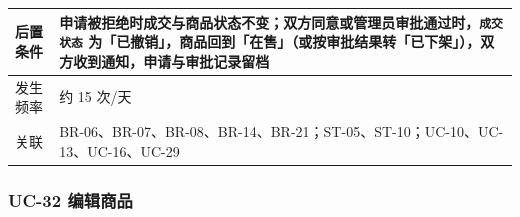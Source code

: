 \documentclass[12pt,a4paper]{ctexart}
\begin{document}
{\begin{longtable}{|p{2.75cm}|p{13.25cm}|}
\hline
后置条件 & 申请被拒绝时成交与商品状态不变；双方同意或管理员审批通过时，\texttt{成交状态} 为「已撤销」，商品回到「在售」（或按审批结果转「已下架」），双方收到通知，申请与审批记录留档 \\
\hline
发生频率 & 约 15 次/天 \\
\hline
关联 & BR-06、BR-07、BR-08、BR-14、BR-21；ST-05、ST-10；UC-10、UC-13、UC-16、UC-29 \\
\hline
\end{longtable}
}



\subsubsection*{UC-32 编辑商品}
\end{document}
